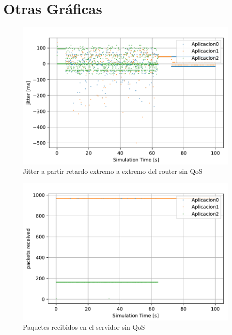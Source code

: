 \chapter{Otras Gráficas}
\label{chap:sinqos}

\begin{figure}[!ht]
    \centering
    \includegraphics{graficas/sinQoS/jitter_SinQoS.pdf}
    \caption{Jitter a partir retardo extremo a extremo del router sin QoS}
    \label{fig:sinqos_jitter}
\end{figure}

\begin{figure}
    \centering
    \includegraphics{graficas/sinQoS/packetsReceived_sinQoS.pdf}
    \caption{Paquetes recibidos en el servidor sin QoS}
    \label{fig:sinqos_pktreceived}
\end{figure}

